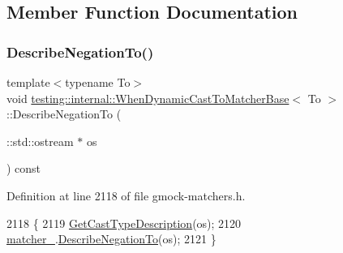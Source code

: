 \subsection{Member Function Documentation}
\mbox{\label{classtesting_1_1internal_1_1WhenDynamicCastToMatcherBase_a0221de18d3b1945f8bc27fb349116564}} 
\subsubsection{\texorpdfstring{Describe\+Negation\+To()}{DescribeNegationTo()}}
{\footnotesize\ttfamily template$<$typename To$>$ \\
void \hyperlink{classtesting_1_1internal_1_1WhenDynamicCastToMatcherBase}{testing\+::internal\+::\+When\+Dynamic\+Cast\+To\+Matcher\+Base}$<$ To $>$\+::Describe\+Negation\+To (\begin{DoxyParamCaption}\item[{\+::std\+::ostream $\ast$}]{os }\end{DoxyParamCaption}) const\hspace{0.3cm}{\ttfamily [inline]}}



Definition at line 2118 of file gmock-\/matchers.\+h.


\begin{DoxyCode}
2118                                                 \{
2119     \hyperlink{classtesting_1_1internal_1_1WhenDynamicCastToMatcherBase_ab3e9a533b6904da05dd7b96703689782}{GetCastTypeDescription}(os);
2120     \hyperlink{classtesting_1_1internal_1_1WhenDynamicCastToMatcherBase_a40d697407c960bee8fe3b125f5ac8730}{matcher\_}.\hyperlink{classtesting_1_1internal_1_1MatcherBase_ac1089d49b6b8a381900618985cd69b7f}{DescribeNegationTo}(os);
2121   \}
\end{DoxyCode}
\mbox{\label{classtesting_1_1internal_1_1WhenDynamicCastToMatcherBase_a6541f9bbcdc21e41521654c603cd2626}} 

